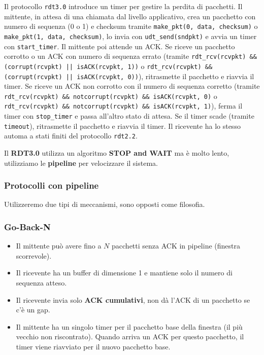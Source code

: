 Il protocollo \texttt{rdt3.0} introduce un timer per gestire la perdita di pacchetti. Il mittente, in attesa di una chiamata dal livello applicativo, crea un pacchetto con numero di sequenza (0 o 1) e checksum tramite \texttt{make\_pkt(0, data, checksum)} o \texttt{make\_pkt(1, data, checksum)}, lo invia con \texttt{udt\_send(sndpkt)} e avvia un timer con \texttt{start\_timer}. Il mittente poi attende un ACK. Se riceve un pacchetto corrotto o un ACK con numero di sequenza errato (tramite \texttt{rdt\_rcv(rcvpkt) \&\& (corrupt(rcvpkt) || isACK(rcvpkt, 1))} o \texttt{rdt\_rcv(rcvpkt) \&\& (corrupt(rcvpkt) || isACK(rcvpkt, 0))}), ritrasmette il pacchetto e riavvia il timer. Se riceve un ACK non corrotto con il numero di sequenza corretto (tramite \texttt{rdt\_rcv(rcvpkt) \&\& notcorrupt(rcvpkt) \&\& isACK(rcvpkt, 0)} o \texttt{rdt\_rcv(rcvpkt) \&\& notcorrupt(rcvpkt) \&\& isACK(rcvpkt, 1)}), ferma il timer con \texttt{stop\_timer} e passa all'altro stato di attesa. Se il timer scade (tramite \texttt{timeout}), ritrasmette il pacchetto e riavvia il timer. Il ricevente ha lo stesso automa a stati finiti del protocollo \texttt{rdt2.2}.

Il \textbf{RDT3.0} utilizza un algoritmo \textbf{STOP and WAIT} ma è molto lento, utilizziamo le \textbf{pipeline} per velocizzare il sistema.

\subsubsection{Protocolli con pipeline}
Utilizzeremo due tipi di meccanismi, sono opposti come filosofia.

\subsubsection{Go-Back-N}
\begin{itemize}
  \item Il mittente può avere fino a $N$ pacchetti senza ACK in pipeline (finestra scorrevole).
  \item Il ricevente ha un buffer di dimensione 1 e mantiene solo il numero di sequenza atteso.
  \item Il ricevente invia solo \textbf{ACK cumulativi}, non dà l'ACK di un pacchetto se c'è un gap.
  \item Il mittente ha un singolo timer per il pacchetto base della finestra (il più vecchio non riscontrato). Quando arriva un ACK per questo pacchetto, il timer viene riavviato per il nuovo pacchetto base.
\end{itemize}

